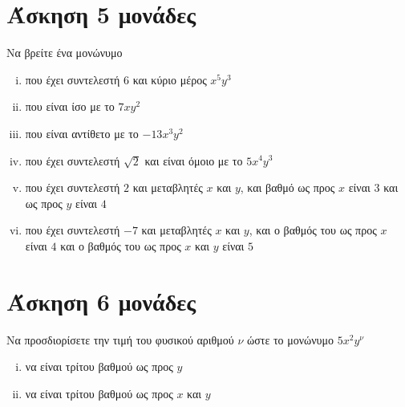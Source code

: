 \documentclass[a4paper,10pt]{report}
\begin{document}
\section*{Άσκηση 5  \hfill \small{}  μονάδες}
Να βρείτε ένα μονώνυμο
\begin{enumerate}[i)]
 \item που έχει συντελεστή $6$ και κύριο μέρος $x^{5}y^{3}$
 \item που είναι ίσο με το $7xy^{2}$
 \item που είναι αντίθετο με το $-13x^{3}y^{2}$
 \item που έχει συντελεστή $\sqrt{2}$ και είναι όμοιο με το $5x^{4}y^{3}$ 
 \item που έχει συντελεστή $2$ και μεταβλητές $x$ και $y$, και βαθμό ως προς $x$ είναι $3$ και ως 
       προς $y$ είναι $4$
 \item που έχει συντελεστή $-7$ και μεταβλητές $x$ και $y$, και ο βαθμός του ως προς $x$ είναι $4$ 
       και ο βαθμός του ως προς $x$ και $y$ είναι $5$
\end{enumerate}



\section*{Άσκηση 6  \hfill \small{}  μονάδες}
Να προσδιορίσετε την τιμή του φυσικού αριθμού $ν$ ώστε το μονώνυμο $5x^{2}y^{ν}$ 
\begin{enumerate}[i)]
 \item να είναι τρίτου βαθμού ως προς $y$
 \item να είναι τρίτου βαθμού ως προς $x$ και $y$
\end{enumerate}

 









\end{document}
